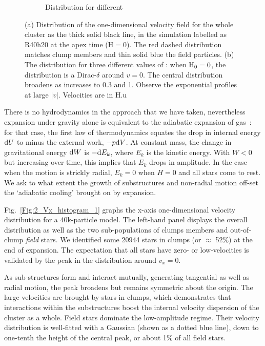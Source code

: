 \begin{figure}
\begin{subfigure}[b]{0.49\textwidth}
        \caption{Distribution for different \tHub}
        \label{Fig:2_Vx_histogram_2}
    \end{subfigure}
\caption{(a) Distribution of the one-dimensional velocity field for the whole cluster as the thick solid black line, in the simulation labelled as R40h20 at the apex time (H$ = 0$). The red dashed distribution matches clump members and thin solid blue the field particles. (b) The distribution for three different values of \tHub: when ${\textrm{H}}_0 = 0$, the distribution is a Dirac-$\delta$ around $v = 0$. The central distribution broadens as \tHub increases to 0.3 and 1. Observe the exponential profiles at large $|v|$. Velocities are in H.u} 
\label{Fig:2_Vx_histogram}
\end{figure}




 There is no hydrodynamics in the approach that we have taken, nevertheless expansion under gravity alone is equivalent to the adiabatic expansion of gas~: for that case, the first law of thermodynamics equates the drop in internal energy ${\rm d}U$ to minus the external work,  $-p {\rm d}V$. At constant mass, the change in gravitational energy ${\rm d}W$ is $ - {\rm d}E_k$, where $E_k$ is the kinetic energy. With $W < 0 $ but increasing over time, this implies that $E_k$ drops in amplitude. In the case when the motion is strickly radial, $E_k = 0$ when $H = 0$ and all stars come to rest. We ask to what extent the growth of substructures and non-radial motion  off-set the `adiabatic cooling' brought on by expansion. 

Fig.~\ref{Fig:2_Vx_histogram_1} graphs the x-axis one-dimensional velocity distribution for a 40k-particle model. The left-hand panel displays the overall distribution as well as the two sub-populations of clumps members and out-of-clump \textit{field} stars. We identified some 20944 stars in clumps (or $\approx $ 52\%) at the end of expansion. The expectation that all stars have zero- or low-velocities is validated by the peak in the distribution around $v_x = 0$.

As sub-structures form and  interact mutually, generating tangential as well as radial motion, the peak broadens but remains symmetric about the origin.  The large velocities are brought by stars in clumps, which demonstrates that interactions within the substructures boost the internal velocity dispersion of the cluster as a whole. Field stars dominate the low-amplitude regime. Their velocity distribution is well-fitted with a  Gaussian (shown as a dotted blue line), down to one-tenth the height of the central peak, or about 1\% of all field stars. 


